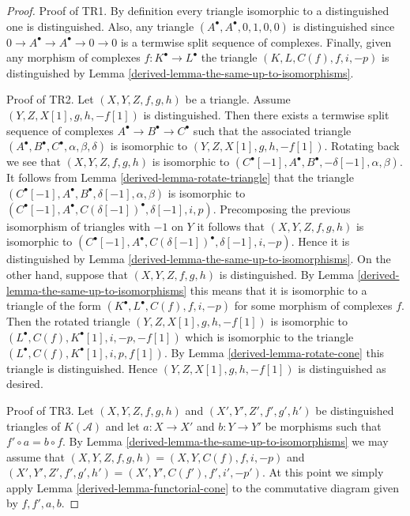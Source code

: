 \begin{proof}

Proof of TR1. By definition every triangle isomorphic to a distinguished
one is distinguished. Also, any triangle $(A^\bullet, A^\bullet, 0, 1, 0, 0)$
is distinguished since $0 \to A^\bullet \to A^\bullet \to 0 \to 0$ is
a termwise split sequence of complexes. Finally, given any morphism of
complexes $f : K^\bullet \to L^\bullet$ the triangle
$(K, L, C(f), f, i, -p)$ is distinguished by
Lemma \ref{derived-lemma-the-same-up-to-isomorphisms}.

\medskip\noindent
Proof of TR2. Let $(X, Y, Z, f, g, h)$ be a triangle.
Assume $(Y, Z, X[1], g, h, -f[1])$ is distinguished.
Then there exists a termwise split sequence of complexes
$A^\bullet \to B^\bullet \to C^\bullet$ such that the associated
triangle $(A^\bullet, B^\bullet, C^\bullet, \alpha, \beta, \delta)$
is isomorphic to $(Y, Z, X[1], g, h, -f[1])$. Rotating back we see
that $(X, Y, Z, f, g, h)$ is isomorphic to
$(C^\bullet[-1], A^\bullet, B^\bullet, -\delta[-1], \alpha, \beta)$.
It follows from Lemma \ref{derived-lemma-rotate-triangle} that the triangle
$(C^\bullet[-1], A^\bullet, B^\bullet, \delta[-1], \alpha, \beta)$
is isomorphic to
$(C^\bullet[-1], A^\bullet, C(\delta[-1])^\bullet, \delta[-1], i, p)$.
Precomposing the previous isomorphism of triangles with $-1$ on $Y$
it follows that $(X, Y, Z, f, g, h)$ is isomorphic to
$(C^\bullet[-1], A^\bullet, C(\delta[-1])^\bullet, \delta[-1], i, -p)$.
Hence it is distinguished by
Lemma \ref{derived-lemma-the-same-up-to-isomorphisms}.
On the other hand, suppose that $(X, Y, Z, f, g, h)$ is distinguished.
By Lemma \ref{derived-lemma-the-same-up-to-isomorphisms} this means that it is
isomorphic to a triangle of the form
$(K^\bullet, L^\bullet, C(f), f, i, -p)$ for some morphism of
complexes $f$. Then the rotated triangle $(Y, Z, X[1], g, h, -f[1])$ is
isomorphic to $(L^\bullet, C(f), K^\bullet[1], i, -p, -f[1])$ which is
isomorphic to the triangle $(L^\bullet, C(f), K^\bullet[1], i, p, f[1])$.
By Lemma \ref{derived-lemma-rotate-cone} this triangle is distinguished.
Hence $(Y, Z, X[1], g, h, -f[1])$ is distinguished as desired.

\medskip\noindent
Proof of TR3. Let
$(X, Y, Z, f, g, h)$ and $(X', Y', Z', f', g', h')$
be distinguished triangles of $K(\mathcal{A})$
and let $a : X \to X'$ and $b : Y \to Y'$ be morphisms
such that $f' \circ a = b \circ f$. By
Lemma \ref{derived-lemma-the-same-up-to-isomorphisms} we may assume that
$(X, Y, Z, f, g, h) = (X, Y, C(f), f, i, -p)$ and
$(X', Y', Z', f', g', h') = (X', Y', C(f'), f', i', -p')$.
At this point we simply apply Lemma \ref{derived-lemma-functorial-cone}
to the commutative diagram given by $f, f', a, b$.


\end{proof}
